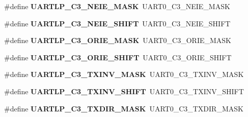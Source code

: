 \begin{DoxyCompactItemize}
\item 
\hypertarget{group___backward___compatibility___symbols_ga5b1c0f5de0179b86f7efd474133a5838}{}\#define {\bfseries U\+A\+R\+T\+L\+P\+\_\+\+C3\+\_\+\+N\+E\+I\+E\+\_\+\+M\+A\+S\+K}~U\+A\+R\+T0\+\_\+\+C3\+\_\+\+N\+E\+I\+E\+\_\+\+M\+A\+S\+K\label{group___backward___compatibility___symbols_ga5b1c0f5de0179b86f7efd474133a5838}

\item 
\hypertarget{group___backward___compatibility___symbols_gaa8aa79a21c751f77d27f76e62753bf9f}{}\#define {\bfseries U\+A\+R\+T\+L\+P\+\_\+\+C3\+\_\+\+N\+E\+I\+E\+\_\+\+S\+H\+I\+F\+T}~U\+A\+R\+T0\+\_\+\+C3\+\_\+\+N\+E\+I\+E\+\_\+\+S\+H\+I\+F\+T\label{group___backward___compatibility___symbols_gaa8aa79a21c751f77d27f76e62753bf9f}

\item 
\hypertarget{group___backward___compatibility___symbols_gaa9293d3cac47a88e5be264b21e110bfd}{}\#define {\bfseries U\+A\+R\+T\+L\+P\+\_\+\+C3\+\_\+\+O\+R\+I\+E\+\_\+\+M\+A\+S\+K}~U\+A\+R\+T0\+\_\+\+C3\+\_\+\+O\+R\+I\+E\+\_\+\+M\+A\+S\+K\label{group___backward___compatibility___symbols_gaa9293d3cac47a88e5be264b21e110bfd}

\item 
\hypertarget{group___backward___compatibility___symbols_gad69f41c3e7e8bd2086748eb86a967220}{}\#define {\bfseries U\+A\+R\+T\+L\+P\+\_\+\+C3\+\_\+\+O\+R\+I\+E\+\_\+\+S\+H\+I\+F\+T}~U\+A\+R\+T0\+\_\+\+C3\+\_\+\+O\+R\+I\+E\+\_\+\+S\+H\+I\+F\+T\label{group___backward___compatibility___symbols_gad69f41c3e7e8bd2086748eb86a967220}

\item 
\hypertarget{group___backward___compatibility___symbols_gad07163dc482ca87cdab056c680c081c2}{}\#define {\bfseries U\+A\+R\+T\+L\+P\+\_\+\+C3\+\_\+\+T\+X\+I\+N\+V\+\_\+\+M\+A\+S\+K}~U\+A\+R\+T0\+\_\+\+C3\+\_\+\+T\+X\+I\+N\+V\+\_\+\+M\+A\+S\+K\label{group___backward___compatibility___symbols_gad07163dc482ca87cdab056c680c081c2}

\item 
\hypertarget{group___backward___compatibility___symbols_gac43e73179815a02e03de14d95c1d29f0}{}\#define {\bfseries U\+A\+R\+T\+L\+P\+\_\+\+C3\+\_\+\+T\+X\+I\+N\+V\+\_\+\+S\+H\+I\+F\+T}~U\+A\+R\+T0\+\_\+\+C3\+\_\+\+T\+X\+I\+N\+V\+\_\+\+S\+H\+I\+F\+T\label{group___backward___compatibility___symbols_gac43e73179815a02e03de14d95c1d29f0}

\item 
\hypertarget{group___backward___compatibility___symbols_ga95dff3853a66ebeee996b014536f86bf}{}\#define {\bfseries U\+A\+R\+T\+L\+P\+\_\+\+C3\+\_\+\+T\+X\+D\+I\+R\+\_\+\+M\+A\+S\+K}~U\+A\+R\+T0\+\_\+\+C3\+\_\+\+T\+X\+D\+I\+R\+\_\+\+M\+A\+S\+K\label{group___backward___compatibility___symbols_ga95dff3853a66ebeee996b014536f86bf}


\end{DoxyCompactItemize}
